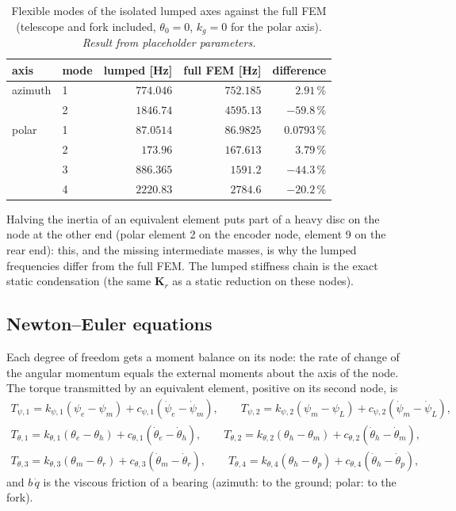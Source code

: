 \documentclass[10pt,a4paper]{article}
\numberwithin{equation}{section}
\begin{document}
\begin{table}[H]\centering\small
\caption{Flexible modes of the isolated lumped axes against the full FEM (telescope and fork included, $\theta_0 = 0$, $k_g = 0$ for the polar axis). \emph{Result from placeholder parameters.}}\label{tab:lump_freq}
\begin{tabular}{llrrr}\toprule
axis & mode & lumped [Hz] & full FEM [Hz] & difference \\ \midrule
azimuth & 1 & $774.046$ & $752.185$ & $2.91\,\%$ \\
 & 2 & $1846.74$ & $4595.13$ & $-59.8\,\%$ \\
polar & 1 & $87.0514$ & $86.9825$ & $0.0793\,\%$ \\
 & 2 & $173.96$ & $167.613$ & $3.79\,\%$ \\
 & 3 & $886.365$ & $1591.2$ & $-44.3\,\%$ \\
 & 4 & $2220.83$ & $2784.6$ & $-20.2\,\%$ \\
\bottomrule\end{tabular}\end{table}
Halving the inertia of an equivalent element puts part of a heavy disc on the node at the other end (polar element 2 on the encoder node, element 9 on the rear end): this, and the missing intermediate masses, is why the lumped frequencies differ from the full FEM. The lumped stiffness chain is the exact static condensation (the same $\mathbf K_r$ as a static reduction on these nodes).
\subsection{Newton--Euler equations}\label{subsec:lump_ne}
Each degree of freedom gets a moment balance on its node: the rate of change of the angular momentum equals the external moments about the axis of the node. The torque transmitted by an equivalent element, positive on its second node, is
\begin{gather}
T_{\psi,1} = k_{\psi,1}(\psi_e - \psi_m) + c_{\psi,1}(\dot\psi_e - \dot\psi_m),\qquad T_{\psi,2} = k_{\psi,2}(\psi_m - \psi_L) + c_{\psi,2}(\dot\psi_m - \dot\psi_L),\\
T_{\theta,1} = k_{\theta,1}(\theta_e - \theta_h) + c_{\theta,1}(\dot\theta_e - \dot\theta_h),\qquad T_{\theta,2} = k_{\theta,2}(\theta_h - \theta_m) + c_{\theta,2}(\dot\theta_h - \dot\theta_m),\\ T_{\theta,3} = k_{\theta,3}(\theta_m - \theta_r) + c_{\theta,3}(\dot\theta_m - \dot\theta_r),\qquad T_{\theta,4} = k_{\theta,4}(\theta_h - \theta_p) + c_{\theta,4}(\dot\theta_h - \dot\theta_p),
\end{gather}
and $b\,\dot q$ is the viscous friction of a bearing (azimuth: to the ground; polar: to the fork).
\end{document}
